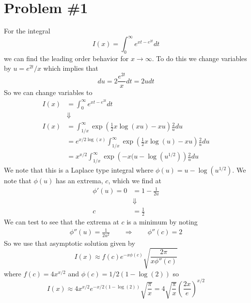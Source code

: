 \documentclass[11pt]{article}
\numberwithin{equation}{section}
\begin{document}


\section{Problem \#1}
For the integral
$$I(x) = \int_{0}^{\infty}e^{xt-e^{2t}}dt$$
we can find the leading order behavior for $x\rightarrow\infty$. To do this we change 
variables by $u = e^{2t}/x$ which implies that 
$$du = 2\frac{e^{2t}}{x}dt = 2udt$$
So we can change variables to
\begin{align*}
I(x) &= \int_{0}^{\infty}e^{xt-e^{2t}}dt\\
&\Downarrow\\
I(x) &= \int_{1/x}^{\infty}\exp\left(\frac{1}{2}x\log(xu)-xu\right)\frac{2}{u}du\\
&= e^{x/2\log(x)}\int_{1/x}^{\infty}\exp\left(\frac{1}{2}x\log(u)-xu\right)\frac{2}{u}du\\
&= x^{x/2}\int_{1/x}^{\infty}\exp\left(-x(u-\log(u^{1/2})\right)\frac{2}{u}du
\end{align*}
We note that this is a Laplace type integral where $\phi(u) = u - \log(u^{1/2})$. We note 
that $\phi(u)$ has an extrema, $c$, which we find at
\begin{align*}
\phi'(u) = 0 &= 1 - \frac{1}{2u}\\
&\Downarrow\\
c &= \frac{1}{2}
\end{align*}
We can test to see that the extrema at $c$ is a minimum by noting 
\begin{align*}
\phi''(u) = \frac{1}{2u^2} \qquad \Rightarrow \qquad \phi''(c) = 2
\end{align*}
So we use that asymptotic solution given by
$$I(x) \approx f(c)e^{-x\phi(c)}\sqrt{\frac{2\pi}{x\phi''(c)}}$$
where $f(c) = 4x^{x/2}$ and $\phi(c) = 1/2(1-\log(2))$ so
$$I(x) \approx 4x^{x/2}e^{-x/2(1-\log(2))}\sqrt{\frac{\pi}{x}} = 4\sqrt{\frac{\pi}{x}}\left(\frac{2x}{e}\right)^{x/2}$$

\pagebreak
\end{document}
